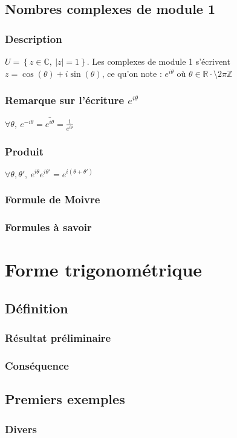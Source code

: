 \documentclass[12pt,a4paper,french]{book}
\begin{document}
		\subsection{Nombres complexes de module 1}
			\subsubsection{Description}
			$U = \left\{z \in \mathbb{C}, \ \left|z\right| = 1\right\}$. Les complexes de module 1 s'écrivent $z = \cos(\theta)+i\sin(\theta)$, ce qu'on note : $ e^{i\theta}$ où $\theta \in \mathbb{R} \cdot\setminus 2\pi \mathbb{Z}$
			\subsubsection{Remarque sur l'écriture $e^{i\theta}$}
			$\forall \theta, \ e^{-i\theta} = \bar{e^{i\theta}} = \frac{1}{e^{i\theta}} $
			\subsubsection{Produit}
			$\forall \theta, \theta', \ e^{i\theta} e^{i\theta'} = e^{i(\theta+\theta')}$
			\subsubsection{Formule de Moivre}
			\subsubsection{Formules à savoir}
	\section{Forme trigonométrique}
		\subsection{Définition}
			\subsubsection{Résultat préliminaire}
			\subsubsection{Conséquence}
		\subsection{Premiers exemples}
			\subsubsection{Divers}
\end{document}
